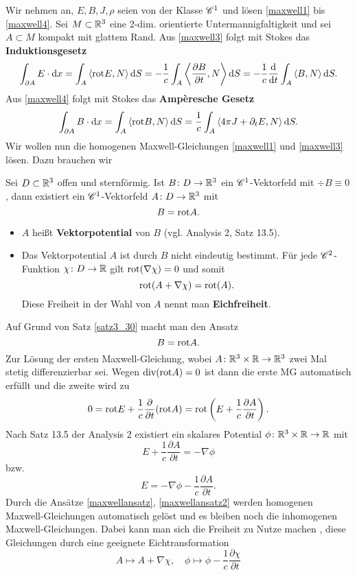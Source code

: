 Wir nehmen an, $E,B,J,\rho$ seien von der Klasse $\mathscr{C}^1$ und lösen \eqref{maxwell1} bis \eqref{maxwell4}. 
Sei $M \subset \mathbb{R}^3$ eine 2-dim. orientierte Untermannigfaltigkeit und sei $A \subset M$ kompakt mit glattem Rand. Aus \eqref{maxwell3} folgt mit Stokes das \textbf{Induktionsgesetz}
\begin{align*}
	\int_{\partial A} E \cdot \mathrm{d} x = \int_A \left\langle\mathrm{rot} E,N \right\rangle \mathrm{d} S = -\frac{1}{c} \int_A \left\langle\frac{\partial B}{\partial t},N \right\rangle \mathrm{d} S = -\frac{1}{c} \frac{\mathrm{d}}{\mathrm{d} t} \int_A \left\langle B,N \right\rangle \mathrm{d} S.
\end{align*}
Aus \eqref{maxwell4} folgt mit Stokes das \textbf{Ampèresche Gesetz}
\begin{align*}
	\int_{\partial A} B \cdot \mathrm{d} x = \int_A \left\langle\mathrm{rot} B,N \right\rangle \mathrm{d} S = \frac{1}{c} \int_A \left\langle4\pi J + \partial_t E,N \right\rangle \mathrm{d} S.
\end{align*}
Wir wollen nun die homogenen Maxwell-Gleichungen \eqref{maxwell1} und \eqref{maxwell3} lösen. Dazu brauchen wir
\begin{satz}\label{satz3_30}
	Sei $D \subset \mathbb{R}^3$ offen und sternförmig. Ist $B \colon D \to \mathbb{R}^3$ ein $\mathscr{C}^1$-Vektorfeld mit $\div B \equiv 0$, dann existiert ein $\mathscr{C}^1$-Vektorfeld $A \colon D \to \mathbb{R}^3$ mit
	\[B = \mathrm{rot} A.\]
\end{satz}
\begin{rem}
	\begin{itemize}
	\item $A$ heißt \textbf{Vektorpotential} von $B$ (vgl. Analysis 2, Satz 13.5). 
	\item Das Vektorpotential $A$ ist durch $B$ nicht eindeutig bestimmt. Für jede $\mathscr{C}^2$-Funktion $\chi \colon D \to \mathbb{R}$ gilt $\mathrm{rot}(\nabla \chi) = 0$ und somit
	\[\mathrm{rot}(A + \nabla \chi) = \mathrm{rot}(A).\]
	Diese Freiheit in der Wahl von $A$ nennt man \textbf{Eichfreiheit}.
	\end{itemize}
\end{rem}
Auf Grund von Satz \ref{satz3_30} macht man den Ansatz
\begin{equation}\label{maxwellansatz}
	B = \mathrm{rot} A.
\end{equation}
Zur Lösung der ersten Maxwell-Gleichung, wobei $A \colon \mathbb{R}^3 \times \mathbb{R} \to \mathbb{R}^3$ zwei Mal stetig differenzierbar sei. Wegen $\mathrm{div}(\mathrm{rot} A) = 0$ ist dann die erste MG automatisch erfüllt und die zweite wird zu 
\[0 = \mathrm{rot} E + \frac{1}{c} \frac{\partial}{\partial t} (\mathrm{rot} A) = \mathrm{rot}\left(E + \frac{1}{c} \frac{\partial A}{\partial t}\right).\]
Nach Satz 13.5 der Analysis 2 existiert ein skalares Potential $\phi \colon \mathbb{R}^3 \times \mathbb{R} \to \mathbb{R}$ mit
\[E + \frac{1}{c} \frac{\partial A}{\partial t} = -\nabla \phi\]
bzw.
\begin{equation}\label{maxwellansatz2}
	E = -\nabla \phi - \frac{1}{c} \frac{\partial A}{\partial t}.
\end{equation}
Durch die Ansätze \eqref{maxwellansatz}, \eqref{maxwellansatz2} werden homogenen Maxwell-Gleichungen automatisch gelöst und es bleiben noch die inhomogenen Maxwell-Gleichungen. Dabei kann man sich die Freiheit zu Nutze machen , diese Gleichungen durch eine geeignete Eichtransformation
\[A \mapsto A + \nabla \chi, \quad \phi \mapsto \phi - \frac{1}{c} \frac{\partial \chi}{\partial t}\]